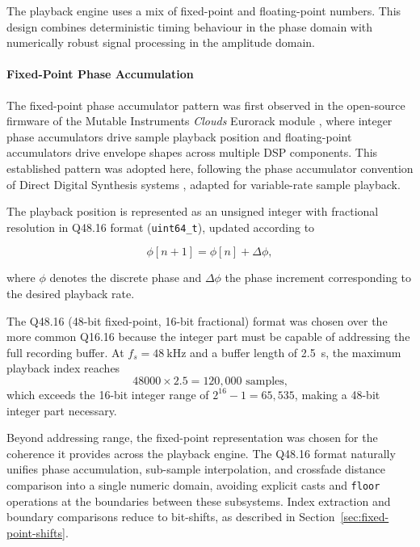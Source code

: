 The playback engine uses a mix of fixed-point and floating-point numbers. This design combines deterministic timing behaviour in the phase domain with numerically robust signal processing in the amplitude domain.

\paragraph{Fixed-Point Phase Accumulation}

The fixed-point phase accumulator pattern was first observed in the open-source firmware of the Mutable Instruments \textit{Clouds} Eurorack module 
\cite{pichenettesPichenettesEurorack2026}, where integer phase accumulators drive sample playback position and floating-point accumulators drive envelope shapes across multiple DSP components. 
This established pattern was adopted here, following the phase accumulator convention of Direct Digital Synthesis systems \cite[p.~49]{josephtierneDigitalFrequencySynthesizer1971}, adapted for variable-rate sample playback. 

The playback position is represented as an unsigned integer with fractional 
resolution in Q48.16 format (\texttt{uint64\_t}), updated according to

\begin{equation}
	\phi[n+1] = \phi[n] + \Delta \phi ,
\end{equation}

where $\phi$ denotes the discrete phase and $\Delta \phi$ the phase increment corresponding to the desired playback rate.

The Q48.16 (48-bit fixed-point, 16-bit fractional) format was chosen over the more common Q16.16 because the integer part must be capable of addressing the full recording buffer.
At $f_s = \qty{48}{\kilo\hertz}$ and a buffer length of \qty{2.5}{\second}, the maximum playback index reaches
\begin{equation}
    48000 \times 2.5 = 120{,}000 \text{ samples,}
\end{equation}
which exceeds the 16-bit integer range of $2^{16} - 1 = 65{,}535$, making a 48-bit integer part necessary.

Beyond addressing range, the fixed-point representation was chosen for the coherence it provides across the playback engine. The Q48.16 format naturally unifies phase accumulation, sub-sample interpolation, and crossfade distance comparison into a single numeric domain, avoiding explicit casts and \texttt{floor} operations at the boundaries between these subsystems.
Index extraction and boundary comparisons reduce to bit-shifts, as described in Section~\ref{sec:fixed-point-shifts}.

